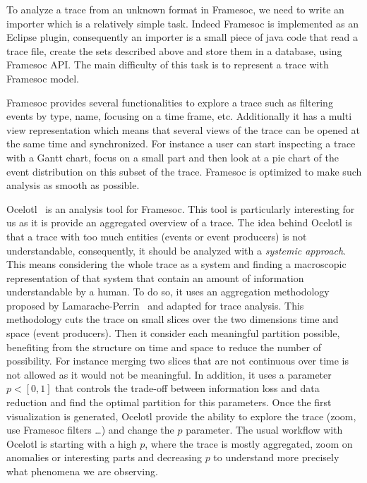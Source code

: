 To analyze a trace from an unknown format in \gls{Framesoc}, we need to write an importer which is a relatively simple task.
Indeed \gls{Framesoc} is implemented as an Eclipse plugin, consequently an importer is a small piece of java code that read a trace file, create the sets described above and store them in a database, using \gls{Framesoc} \gls{API}.
The main difficulty of this task is to represent a trace with \gls{Framesoc} model.

\gls{Framesoc} provides several functionalities to explore a trace such as filtering events by type, name, focusing on a time frame, etc.
Additionally it has a multi view representation which means that several views of the trace can be opened at the same time and synchronized.
For instance a user can start inspecting a trace with a Gantt chart, focus on a small part and then look at a pie chart of the event distribution on this subset of the trace.
\gls{Framesoc} is optimized to make such analysis as smooth as possible.

\gls{Ocelotl}~\cite{Dosimont14Ocelotl} is an analysis tool for \gls{Framesoc}.
This tool is particularly interesting for us as it is provide an aggregated overview of a trace.
The idea behind \gls{Ocelotl} is that a trace with too much entities (events or event producers) is not understandable, consequently, it should be analyzed with a \emph{systemic approach}.
This means considering the whole trace as a system and finding a macroscopic representation of that system that contain an amount of information understandable by a human.
To do so, it uses an aggregation methodology proposed by Lamarache-Perrin~\cite{Lamarche_Perrin14Agregation} and adapted for trace analysis.
This methodology cuts the trace on small slices over the two dimensions time and space (event producers).
Then it consider each meaningful partition possible, benefiting from the structure on time and space to reduce the number of possibility.
For instance merging two slices that are not continuous over time is not allowed as it would not be meaningful.
In addition, it uses a parameter $p<[0,1]$ that controls the trade-off between information loss and data reduction and find the optimal partition for this parameters.
Once the first visualization is generated, \gls{Ocelotl} provide the ability to explore the trace (zoom, use \gls{Framesoc} filters \ldots) and change the $p$ parameter.
The usual workflow with \gls{Ocelotl} is starting with a high $p$, where the trace is mostly aggregated, zoom on anomalies or interesting parts and decreasing $p$ to understand more precisely what phenomena we are observing.

